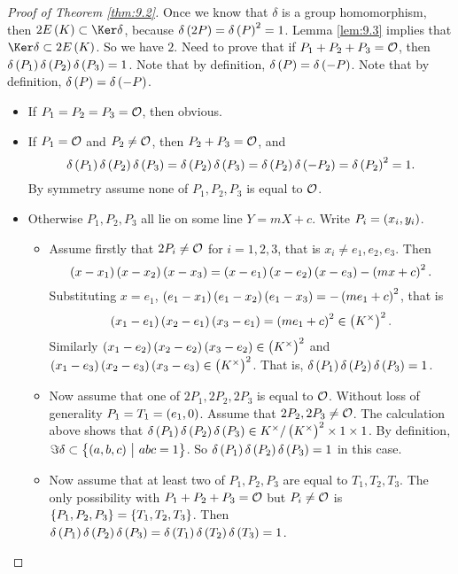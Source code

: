 \begin{proof}[Proof of Theorem \ref{thm:9.2}]
Once we know that $ \delta $ is a group homomorphism, then $ 2E\br{K} \subset \Ker \delta $, because $ \delta\br{2P} = \delta\br{P}^2 = 1 $. Lemma \ref{lem:9.3} implies that $ \Ker \delta \subset 2E\br{K} $. So we have $ 2 $. Need to prove that if $ P_1 + P_2 + P_3 = \mathcal{O} $, then $ \delta\br{P_1}\delta\br{P_2}\delta\br{P_3} = 1 $. Note that by definition, $ \delta\br{P} = \delta\br{-P} $. Note that by definition, $ \delta\br{P} = \delta\br{-P} $.
\begin{itemize}
\item If $ P_1 = P_2 = P_3 = \mathcal{O} $, then obvious.
\item If $ P_1 = \mathcal{O} $ and $ P_2 \ne \mathcal{O} $, then $ P_2 + P_3 = \mathcal{O} $, and
$$ \delta\br{P_1}\delta\br{P_2}\delta\br{P_3} = \delta\br{P_2}\delta\br{P_3} = \delta\br{P_2}\delta\br{-P_2} = \delta\br{P_2}^2 = 1. $$
By symmetry assume none of $ P_1, P_2, P_3 $ is equal to $ \mathcal{O} $.

\pagebreak

\item Otherwise $ P_1, P_2, P_3 $ all lie on some line $ Y = mX + c $. Write $ P_i = \br{x_i, y_i} $.
\begin{itemize}
\item Assume firstly that $ 2P_i \ne \mathcal{O} $ for $ i = 1, 2, 3 $, that is $ x_i \ne e_1, e_2, e_3 $. Then
$$ \br{x - x_1}\br{x - x_2}\br{x - x_3} = \br{x - e_1}\br{x - e_2}\br{x - e_3} - \br{mx + c}^2. $$
Substituting $ x = e_1 $, $ \br{e_1 - x_1}\br{e_1 - x_2}\br{e_1 - x_3} = -\br{me_1 + c}^2 $, that is
$$ \br{x_1 - e_1}\br{x_2 - e_1}\br{x_3 - e_1} = \br{me_1 + c}^2 \in \br{K^\times}^2. $$
Similarly $ \br{x_1 - e_2}\br{x_2 - e_2}\br{x_3 - e_2} \in \br{K^\times}^2 $ and $ \br{x_1 - e_3}\br{x_2 - e_3}\br{x_3 - e_3} \in \br{K^\times}^2 $. That is, $ \delta\br{P_1}\delta\br{P_2}\delta\br{P_3} = 1 $.
\item Now assume that one of $ 2P_1, 2P_2, 2P_3 $ is equal to $ \mathcal{O} $. Without loss of generality $ P_1 = T_1 = \br{e_1, 0} $. Assume that $ 2P_2, 2P_3 \ne \mathcal{O} $. The calculation above shows that $ \delta\br{P_1}\delta\br{P_2}\delta\br{P_3} \in K^\times / \br{K^\times}^2 \times 1 \times 1 $. By definition, $ \Im \delta \subset \cbr{\br{a, b, c} \st abc = 1} $. So $ \delta\br{P_1}\delta\br{P_2}\delta\br{P_3} = 1 $ in this case.
\item Now assume that at least two of $ P_1, P_2, P_3 $ are equal to $ T_1, T_2, T_3 $. The only possibility with $ P_1 + P_2 + P_3 = \mathcal{O} $ but $ P_i \ne \mathcal{O} $ is $ \cbr{P_1, P_2, P_3} = \cbr{T_1, T_2, T_3} $. Then $ \delta\br{P_1}\delta\br{P_2}\delta\br{P_3} = \delta\br{T_1}\delta\br{T_2}\delta\br{T_3} = 1 $.
\end{itemize}
\end{itemize}
\end{proof}

